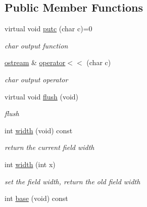 \subsection*{Public Member Functions}
\begin{DoxyCompactItemize}
\item 
virtual void \hyperlink{classhwlib_1_1ostream_a3b2b77c9e933b76bd6ddd85b9883a31b}{putc} (char c)=0
\begin{DoxyCompactList}\small\item\em char output function \end{DoxyCompactList}\item 
\hyperlink{classhwlib_1_1ostream}{ostream} \& \hyperlink{classhwlib_1_1ostream_ab7fd8d969cd3533df36944233da5c64b}{operator$<$$<$} (char c)\hypertarget{classhwlib_1_1ostream_ab7fd8d969cd3533df36944233da5c64b}{}\label{classhwlib_1_1ostream_ab7fd8d969cd3533df36944233da5c64b}

\begin{DoxyCompactList}\small\item\em char output operator \end{DoxyCompactList}\item 
virtual void \hyperlink{classhwlib_1_1ostream_ab4587e3151fc02c5faba3b06522e337f}{flush} (void)
\begin{DoxyCompactList}\small\item\em flush \end{DoxyCompactList}\item 
int \hyperlink{classhwlib_1_1ostream_aa4d58cb368e67310cd70bf9cc8579966}{width} (void) const \hypertarget{classhwlib_1_1ostream_aa4d58cb368e67310cd70bf9cc8579966}{}\label{classhwlib_1_1ostream_aa4d58cb368e67310cd70bf9cc8579966}

\begin{DoxyCompactList}\small\item\em return the current field width \end{DoxyCompactList}\item 
int \hyperlink{classhwlib_1_1ostream_a3f65c4ae6cba8d58e7f5b21f19667c0f}{width} (int x)\hypertarget{classhwlib_1_1ostream_a3f65c4ae6cba8d58e7f5b21f19667c0f}{}\label{classhwlib_1_1ostream_a3f65c4ae6cba8d58e7f5b21f19667c0f}

\begin{DoxyCompactList}\small\item\em set the field width, return the old field width \end{DoxyCompactList}\item 
int \hyperlink{classhwlib_1_1ostream_a6266f7f74a244b69c33d4c6d9be6c145}{base} (void) const \hypertarget{classhwlib_1_1ostream_a6266f7f74a244b69c33d4c6d9be6c145}{}\label{classhwlib_1_1ostream_a6266f7f74a244b69c33d4c6d9be6c145}


\end{DoxyCompactItemize}
